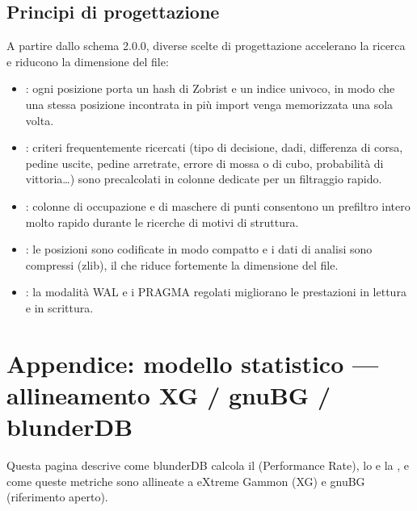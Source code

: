 \documentclass[letterpaper,10pt,italian]{sphinxmanual}
\begin{document}
\subsection{Principi di progettazione}
\label{\detokenize{annexe_db_scheme:principes-de-conception}}
\sphinxAtStartPar
A partire dallo schema 2.0.0, diverse scelte di progettazione accelerano la ricerca e riducono la dimensione del file:
\begin{itemize}
\item {} 
\sphinxAtStartPar
{}: ogni posizione porta un hash di Zobrist e un indice univoco, in modo che una stessa posizione incontrata in più import venga memorizzata una sola volta.

\item {} 
\sphinxAtStartPar
{}: criteri frequentemente ricercati (tipo di decisione, dadi, differenza di corsa, pedine uscite, pedine arretrate, errore di mossa o di cubo, probabilità di vittoria…) sono precalcolati in colonne dedicate per un filtraggio rapido.

\item {} 
\sphinxAtStartPar
{}: colonne di occupazione e di maschere di punti consentono un prefiltro intero molto rapido durante le ricerche di motivi di struttura.

\item {} 
\sphinxAtStartPar
{}: le posizioni sono codificate in modo compatto e i dati di analisi sono compressi (zlib), il che riduce fortemente la dimensione del file.

\item {} 
\sphinxAtStartPar
{}: la modalità WAL e i PRAGMA regolati migliorano le prestazioni in lettura e in scrittura.

\end{itemize}

\sphinxstepscope


\section{Appendice: modello statistico — allineamento XG / gnuBG / blunderDB}
\label{\detokenize{stats_parity:annexe-modele-de-statistiques-alignement-xg-gnubg-blunderdb}}\label{\detokenize{stats_parity:stats-parity}}\label{\detokenize{stats_parity::doc}}
\sphinxAtStartPar
Questa pagina descrive come blunderDB calcola il  (Performance Rate), lo  e la , e come queste metriche sono allineate a eXtreme Gammon (XG) e gnuBG (riferimento aperto).
\end{document}
